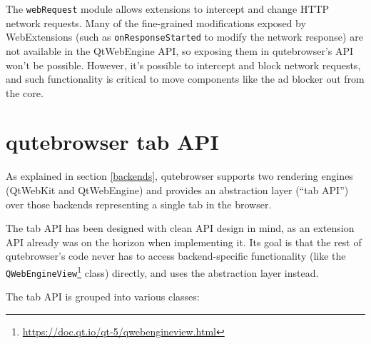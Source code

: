 The \verb|webRequest| module allows extensions to intercept and change HTTP
network requests. Many of the fine-grained modifications exposed by
WebExtensions (such as \verb|onResponseStarted| to modify the network response)
are not available in the QtWebEngine API, so exposing them in qutebrowser's API
won't be possible. However, it's possible to intercept and block network
requests, and such functionality is critical to move components like the ad
blocker out from the core.

\section{qutebrowser tab API}
\label{tabapi}

As explained in section \ref{backends}, qutebrowser supports two rendering
engines (QtWebKit and QtWebEngine) and provides an abstraction layer (``tab
API'') over those backends representing a single tab in the browser.

The tab API has been designed with clean API design in mind, as an extension API
already was on the horizon when implementing it. Its goal is that the rest of
qutebrowser's code never has to access backend-specific functionality (like the
\verb|QWebEngineView|\footnote{\url{https://doc.qt.io/qt-5/qwebengineview.html}}
class) directly, and uses the abstraction layer instead.

The tab API is grouped into various classes:

